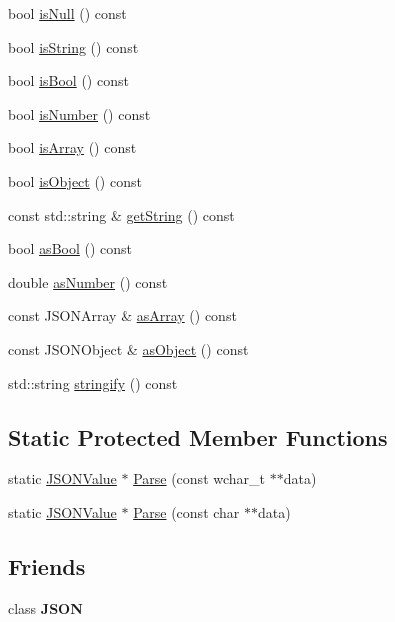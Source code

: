 \begin{DoxyCompactItemize}
\item 
bool \hyperlink{classJSONValue_a0aee5e9041833102ace9c295c5ba04a1}{is\-Null} () const 
\item 
bool \hyperlink{classJSONValue_a7d55132933149e63e76a49c468142461}{is\-String} () const 
\item 
bool \hyperlink{classJSONValue_aead35875f85ebe8218ae008bc94287d5}{is\-Bool} () const 
\item 
bool \hyperlink{classJSONValue_ae18150f35323645dc3b1e6d1bc217196}{is\-Number} () const 
\item 
bool \hyperlink{classJSONValue_ae42e5a0a9a847948d88d21d904fa6ae2}{is\-Array} () const 
\item 
bool \hyperlink{classJSONValue_a4f55c32b852110bb4fbf6ae1bceb572d}{is\-Object} () const 
\item 
const std\-::string \& \hyperlink{classJSONValue_a63cfcf962505c1e0e8360d1a62487f73}{get\-String} () const 
\item 
bool \hyperlink{classJSONValue_a16a16d04c67898096289e3e2d07b4de4}{as\-Bool} () const 
\item 
double \hyperlink{classJSONValue_a4e889d5fae91abbb951ae664b3d9db3e}{as\-Number} () const 
\item 
const \-J\-S\-O\-N\-Array \& \hyperlink{classJSONValue_ae0f1cc305919d110eb34d41f40ae3d73}{as\-Array} () const 
\item 
const \-J\-S\-O\-N\-Object \& \hyperlink{classJSONValue_a139ff1bf529945a0a9b8e243a2029867}{as\-Object} () const 
\item 
std\-::string \hyperlink{classJSONValue_a05fdc2f472ead8269e6d10fd3fba4834}{stringify} () const 
\end{DoxyCompactItemize}
\subsection*{\-Static \-Protected \-Member \-Functions}
\begin{DoxyCompactItemize}
\item 
static \hyperlink{classJSONValue}{\-J\-S\-O\-N\-Value} $\ast$ \hyperlink{classJSONValue_abfbaa2b86a6c0f5ea3d358077d653709}{\-Parse} (const wchar\-\_\-t $\ast$$\ast$data)
\item 
static \hyperlink{classJSONValue}{\-J\-S\-O\-N\-Value} $\ast$ \hyperlink{classJSONValue_a07040bc6b1968981ab9afb43c7bf0afe}{\-Parse} (const char $\ast$$\ast$data)
\end{DoxyCompactItemize}
\subsection*{\-Friends}
\begin{DoxyCompactItemize}
\item 
\hypertarget{classJSONValue_a728457b3a16eb0c54a04dbcdd6ae7baf}{class {\bfseries \-J\-S\-O\-N}}\label{classJSONValue_a728457b3a16eb0c54a04dbcdd6ae7baf}

\end{DoxyCompactItemize}


